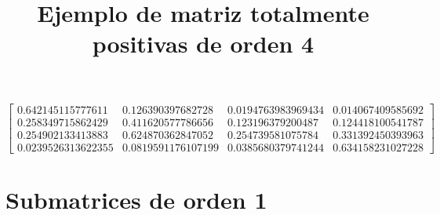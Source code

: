 \documentclass[12pt]{article}
\begin{document}
\title{Ejemplo de matriz totalmente positivas de orden 4}
\maketitle

$$\left[\begin{matrix}0.642145115777611 & 0.126390397682728 & 0.0194763983969434 & 0.014067409585692\\0.258349715862429 & 0.411620577786656 & 0.123196379200487 & 0.124418100541787\\0.254902133413883 & 0.624870362847052 & 0.254739581075784 & 0.331392450393963\\0.0239526313622355 & 0.0819591176107199 & 0.0385680379741244 & 0.634158231027228\end{matrix}\right]$$


\section*{Submatrices de orden 1}
\end{document}
